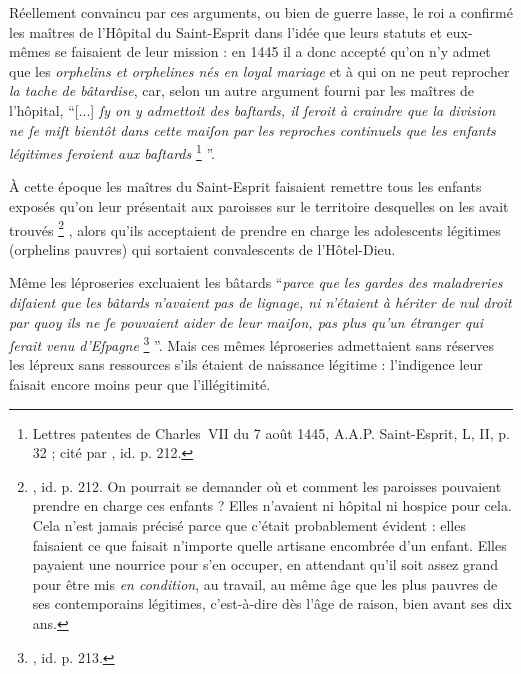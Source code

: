  Réellement convaincu par ces arguments, ou bien de guerre lasse, le roi a confirmé les maîtres de l'Hôpital du Saint-Esprit dans l'idée que leurs statuts et eux-mêmes se faisaient de leur mission : en 1445 il a donc accepté qu'on n'y admet que les \emph{orphelins et orphelines nés en loyal mariage} et à qui on ne peut reprocher \emph{la tache de bâtardise}, car, selon un autre argument fourni par les maîtres de l'hôpital, \enquote{[...] \emph{ſy on y admettoit des baſtards, il ſeroit à craindre que la division ne ſe miſt bientôt dans cette maiſon par les reproches continuels que les enfants légitimes feroient aux baſtards}%
\footnote{Lettres patentes de Charles~VII du 7 août 1445, A.A.P. Saint-Esprit, L, II, p. 32 ; cité par , id. p. 212.}%
}.

 À cette époque les maîtres du Saint-Esprit faisaient remettre tous les enfants exposés qu'on leur présentait aux paroisses sur le territoire desquelles on les avait trouvés%
\footnote{, id. p. 212. On pourrait se demander où et comment les paroisses pouvaient prendre en charge ces enfants ? Elles n'avaient ni hôpital ni hospice pour cela. Cela n'est jamais précisé parce que c'était probablement évident : elles faisaient ce que faisait n'importe quelle artisane encombrée d'un enfant. Elles payaient une nourrice pour s'en occuper, en attendant qu'il soit assez grand pour être mis \emph{en condition}, au travail, au même âge que les plus pauvres de ses contemporains légitimes, c'est-à-dire dès l'âge de raison, bien avant ses dix ans.}%
, alors qu'ils acceptaient de prendre en charge les adolescents légitimes (orphelins pauvres) qui sortaient convalescents de l'Hôtel-Dieu. 

 Même les léproseries excluaient les bâtards \enquote{\emph{parce que les gardes des maladreries diſaient que les bâtards n'avaient pas de lignage, ni n'étaient à hériter de nul droit par quoy ils ne ſe pouvaient aider de leur maiſon, pas plus qu'un étranger qui ſerait venu d'Eſpagne}%
\footnote{, id. p. 213.}%
}. Mais ces mêmes léproseries admettaient sans réserves les lépreux sans ressources s'ils étaient de naissance légitime : l'indigence leur faisait encore moins peur que l'illégitimité.

